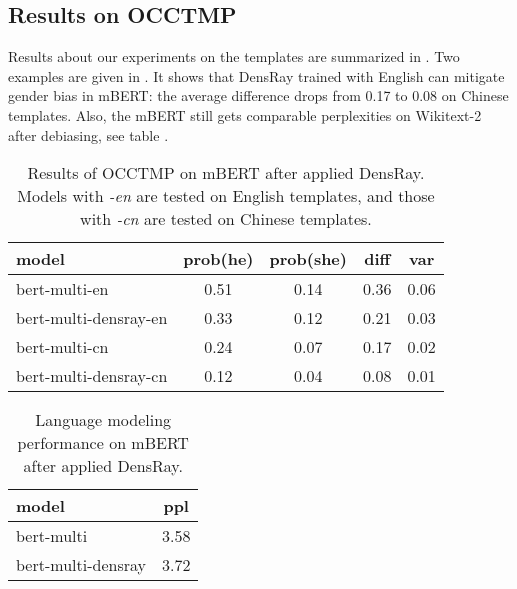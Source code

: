 \subsection{Results on OCCTMP}
Results about our experiments on the templates are summarized in . Two examples are given in . It shows that DensRay trained with English can mitigate gender bias in mBERT: the average difference drops from 0.17 to 0.08 on Chinese templates. Also, the mBERT still gets comparable perplexities on Wikitext-2 after debiasing, see table . 
\begin{table}[ht]
\centering
\footnotesize
\begin{tabular}{lcccc}
\hline
model & prob(he) & prob(she) & diff & var\\
\hline
\scriptsize bert-multi-en 
& 0.51 & 0.14 & 0.36 & 0.06 \\
\scriptsize 
bert-multi-densray-en & 0.33 & 0.12 & 0.21 & 0.03 \\
\scriptsize bert-multi-cn 
& 0.24 & 0.07 & 0.17 & 0.02 \\
\scriptsize bert-multi-densray-cn 
& 0.12 & 0.04 & 0.08 & 0.01\\
\hline
\end{tabular}
\caption{
Results of OCCTMP on mBERT after applied DensRay. Models with \textit{-en} are tested on English templates, and those with \textit{-cn} are tested on Chinese templates.}
\end{table}
\begin{table}[ht]
\centering
\footnotesize
\begin{tabular}{lc}
\hline
model & ppl\\
\hline
bert-multi & 3.58\\
bert-multi-densray & 3.72\\
\hline
\end{tabular}
\caption{
Language modeling performance on mBERT after applied DensRay. }
\end{table}
